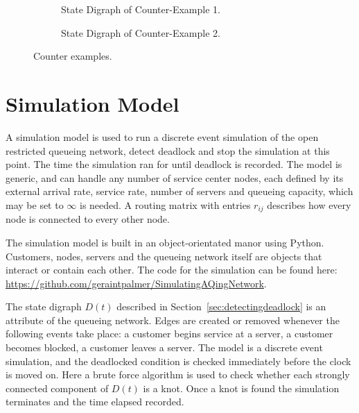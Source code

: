 \documentclass{article}
\begin{document}
\begin{figure}
\begin{subfigure}{0.5\textwidth}
\begin{center}

\end{center}
\caption{State Digraph of Counter-Example 1.}
\label{fig:counter_example_1}
\end{subfigure}
\begin{subfigure}{0.5\textwidth}
\begin{center}

\end{center}
\caption{State Digraph of Counter-Example 2.}
\label{fig:counter_example_2}
\end{subfigure}
\caption{Counter examples.}
\label{fig:counter_examples}
\end{figure}










\section{Simulation Model}\label{sec:simulation}

A simulation model is used to run a discrete event simulation of the open restricted queueing network, detect deadlock and stop the simulation at this point.
The time the simulation ran for until deadlock is recorded.
The model is generic, and can handle any number of service center nodes, each defined by its external arrival rate, service rate, number of servers and queueing capacity, which may be set to $\infty$ is needed.
A routing matrix with entries $r_{ij}$ describes how every node is connected to every other node.

The simulation model is built in an object-orientated manor using Python.
Customers, nodes, servers and the queueing network itself are objects that interact or contain each other.
The code for the simulation can be found here: \url{https://github.com/geraintpalmer/SimulatingAQingNetwork}.

The state digraph $D(t)$ described in Section~\ref{sec:detectingdeadlock} is an attribute of the queueing network.
Edges are created or removed whenever the following events take place: a customer begins service at a server, a customer becomes blocked, a customer leaves a server.
The model is a discrete event simulation, and the deadlocked condition is checked immediately before the clock is moved on.
Here a brute force algorithm is used to check whether each strongly connected component of $D(t)$ is a knot.
Once a knot is found the simulation terminates and the time elapsed recorded.
\end{document}
